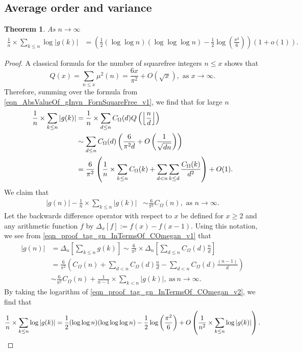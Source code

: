 \documentclass[11pt,reqno,a4letter]{article}
\numberwithin{equation}{section}
\numberwithin{figure}{section}
\numberwithin{table}{section}
\newcommand{\seqnum}[1]{\href{http://oeis.org/#1}{\color{ProcessBlue}{\underline{#1}}}}
\newcommand{\Floor}[2]{\ensuremath{\left\lfloor \frac{#1}{#2} \right\rfloor}}
\theoremstyle{plain}
\newtheorem{theorem}{Theorem}
\numberwithin{theorem}{section}
\theoremstyle{definition}
\begin{document}
\subsection{Average order and variance} 

\begin{theorem} 
\label{cor_ExpectationFormulaAbsgInvn_v2} 
As $n \rightarrow \infty$ 
\begin{align*} 
\frac{1}{n} \times \sum_{k \leq n} \log |g(k)| & = 
	\left(\frac{1}{2} (\log\log n)(\log\log\log n) - 
	\frac{1}{2} \log\left(\frac{\pi^2}{6}\right)\right)(1 + o(1)). 
\end{align*} 
\end{theorem} 
\begin{proof}
A classical formula for the number of squarefree integers $n \leq x$ shows that 
\cite[\S 18.6]{HARDYWRIGHT} \cite[\seqnum{A013928}]{OEIS} 
\[ 
Q(x) = \sum_{n \leq x} \mu^2(n) = \frac{6x}{\pi^2} + O\left(\sqrt{x}\right), 
     \text{\ as $x \rightarrow \infty$}. 
\]
Therefore, summing over the formula from 
\eqref{eqn_AbsValueOf_gInvn_FornSquareFree_v1}, we find that for large $n$  
\begin{align} 
\notag 
\frac{1}{n} \times \sum_{k \leq n} |g(k)| & = \frac{1}{n} \times \sum_{d \leq n} 
     C_{\Omega}(d) Q\left(\Floor{n}{d}\right) \\ 
\notag 
     & \sim \sum_{d \leq n} C_{\Omega}(d) \left(\frac{6}{\pi^2 d} + O\left(\frac{1}{\sqrt{dn}}\right) 
     \right) \\ 
\label{eqn_proof_tag_gn_InTermsOf_COmegan_v1}
     & = \frac{6}{\pi^2} \left(\frac{1}{n} \times \sum_{k \leq n} C_{\Omega}(k) + \sum_{d<n} 
     \sum_{k \leq d} \frac{C_{\Omega}(k)}{d^2}\right) + O(1). 
\end{align} 
We claim that 
\begin{align}
\label{eqn_proof_tag_gn_InTermsOf_COmegan_v2}
|g(n)| - \frac{1}{n} \times \sum_{k \leq n} |g(k)| & \sim \frac{6}{\pi^2} C_{\Omega}(n), 
     \text{\ as\ } n \rightarrow \infty. 
\end{align} 
Let the backwards difference operator with respect to $x$ 
be defined for $x \geq 2$ and any arithmetic function $f$ by 
$\Delta_x[f] := f(x) - f(x-1)$. 
Using this notation, we see from \eqref{eqn_proof_tag_gn_InTermsOf_COmegan_v1} that 
\begin{align*} 
     |g(n)| & = \Delta_n\left[\sum_{k \leq n} g(k)\right]  
     \sim \frac{6}{\pi^2} \times 
     \Delta_n\left[\sum_{d \leq n} C_{\Omega}(d) \frac{n}{d}\right] \\ 
     & = \frac{6}{\pi^2}\left(C_{\Omega}(n) + \sum_{d < n} C_{\Omega}(d) \frac{n}{d} - 
     \sum_{d<n} C_{\Omega}(d) \frac{(n-1)}{d}\right) \\ 
     & \sim \frac{6}{\pi^2} C_{\Omega}(n) + \frac{1}{n-1} \times \sum_{k < n} |g(k)|, 
     \mathrm{\ as\ } n \rightarrow \infty. 
\end{align*} 
By taking the logarithm of \eqref{eqn_proof_tag_gn_InTermsOf_COmegan_v2}, we find that
\[
\frac{1}{n} \times \sum_{k \leq n} \log |g(k)| = 
	\frac{1}{2} (\log\log n) (\log\log\log n) - 
     \frac{1}{2}\log\left(\frac{\pi^2}{6}\right) + 
     O\left(\frac{1}{n^2} \times \sum_{k \leq n} \log |g(k)|\right). 
     \qedhere
\]
\end{proof} 
\end{document}
